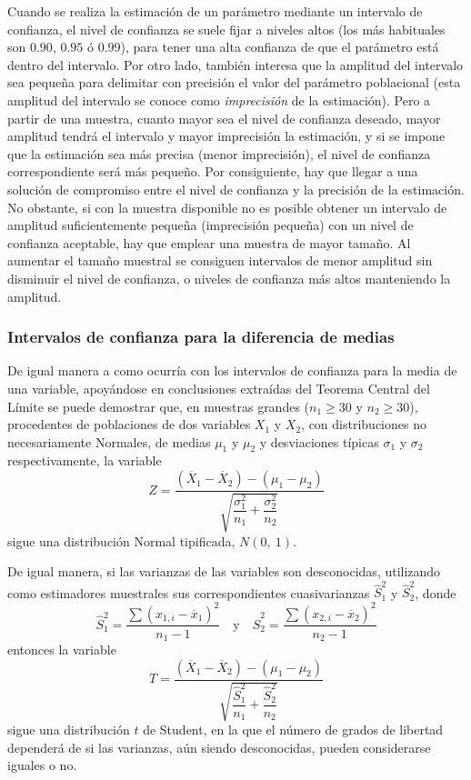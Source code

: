 Cuando se realiza la estimación de un parámetro mediante un intervalo de confianza, el nivel de confianza se suele fijar
a niveles altos (los más habituales son $0.90$, $0.95$ ó $0.99$), para tener una alta confianza de que el parámetro está
dentro del intervalo. Por otro lado, también interesa que la amplitud del intervalo sea pequeña para delimitar con
precisión el valor del parámetro poblacional (esta amplitud del intervalo se conoce como \emph{imprecisión} de la
estimación). Pero a partir de una muestra, cuanto mayor sea el nivel de confianza deseado, mayor amplitud tendrá el
intervalo y mayor imprecisión la estimación, y si se impone que la estimación sea más precisa (menor imprecisión), el
nivel de confianza correspondiente será más pequeño. Por consiguiente, hay que llegar a una solución de compromiso entre
el nivel de confianza y la precisión de la estimación. No obstante, si con la muestra disponible no es posible obtener un
intervalo de amplitud suficientemente pequeña (imprecisión pequeña) con un nivel de confianza aceptable, hay que emplear
una muestra de mayor tamaño. Al aumentar el tamaño muestral se consiguen intervalos de menor amplitud sin disminuir el
nivel de confianza, o niveles de confianza más altos manteniendo la amplitud.


\subsubsection{Intervalos de confianza para la diferencia de medias}
De igual manera a como ocurría con los intervalos de confianza para la media de una variable, apoyándose en conclusiones
extraídas del Teorema Central del Límite se puede demostrar que, en muestras grandes ($n_1\geq30$ y $n_2\geq30$),
procedentes de poblaciones de dos variables $X_1$ y $X_2$, con distribuciones no necesariamente Normales, de medias $\mu
_{1}$ y $\mu _{2}$ y desviaciones típicas $\sigma_{1}$ y $\sigma_{2}$ respectivamente, la variable \[Z= \dfrac{\left(
\overline{X}_{1}-\overline{X}_{2}\right) -(\mu _{1}-\mu _{2})}{\sqrt{\dfrac{\sigma _{1}^{2}}{n_{1}}+\dfrac{\sigma
_{2}^{2}}{n_{2}}}} \] sigue una distribución Normal tipificada, $N(0,\ 1)$.

De igual manera, si las varianzas de las variables son desconocidas, utilizando como estimadores muestrales sus
correspondientes cuasivarianzas $\hat S^2_{1}$ y $\hat S^2_{2}$, donde 
\[
\hat S_{1}^{2}= \dfrac{\sum \left( x_{1,i}-\overline{x}_{1}\right) ^{2}}{n_{1}-1}
\quad \text{y} \quad \hat S_{2}^{2}= \dfrac{\sum \left( x_{2,i}-\overline{x}_{2}\right) ^{2}}{n_{2}-1}
\]
entonces la variable 
\[
T= \dfrac{\left( \overline{X}_{1}-\overline{X}_{2}\right) -(\mu
_{1}-\mu_{2})}{\sqrt{\dfrac{\hat S_{1}^{2}}{n_{1}}+\dfrac{\hat S_{2}^{2}}{n_{2}}}}
\]
sigue una distribución $t$ de Student, en la que el número de grados de libertad dependerá de si las varianzas, aún
siendo desconocidas, pueden considerarse iguales o no.

